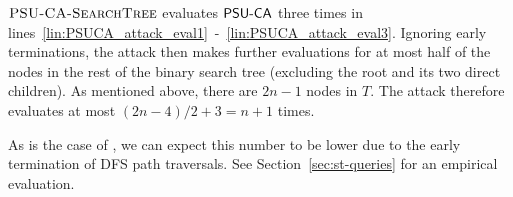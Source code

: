 $\textsc{PSU\mbox{-}CA\mbox{-}SearchTree}$ evaluates $\mathsf{PSU\mbox{-}CA}$ three times in
lines~\ref{lin:PSUCA_attack_eval1}~-~\ref{lin:PSUCA_attack_eval3}. Ignoring
early terminations, the attack then makes further evaluations for at most half
of the nodes in the rest of the binary search tree (excluding the root and its
two direct children).  As mentioned above, there are $2n - 1$ nodes in $T$.  The
attack therefore evaluates \PSUCA{} at most $(2n - 4) / 2 + 3 = n + 1$ times.

As is the case of \PSICAattack{}, we can expect this number to be lower due to
the early termination of DFS path traversals. 
See Section~\ref{sec:st-queries} for an empirical evaluation.




